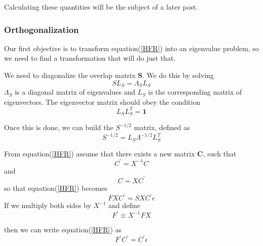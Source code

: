 \documentclass[a4paper]{article}
\begin{document}
Calculating these quantities will be the subject of a later post.

\subsubsection{Orthogonalization}
Our first objective is to transform equation(\ref{HFR}) into an eigenvalue problem, so we need to find a transformation that will do just that.

We need to diagonalize the overlap matrix \textbf{S}. 
We do this by solving
$$
S L_S = \Lambda_S L_S
$$
$\Lambda_S$ is a diagonal matrix of eigenvalues and $L_S$ is the corresponding matrix of eigenvectors.
The eigenvector matrix should obey the condition
$$
L_S L^{T}_{S} = \boldsymbol 1
$$

Once this is done, we can build the $ S^{-1/2}$ matrix, defined as 
$$
S^{-1/2} = L_S \Lambda^{-1/2} L^{T}_{S}
$$

From equation(\ref{HFR}) assume that there exists a new matrix \textbf{C}, such that
$$
C^' = X^{-1} C
$$
and 
$$
C = X C^'
$$
so that equation(\ref{HFR}) becomes
$$
F X C^' = SXC^' \epsilon
$$
If we multiply both sides by $X^{-1}$ and define
$$
F^' \equiv X^{-1} F X
$$

then we can write equation(\ref{HFR}) as 
$$
F^' C^' = C^' \epsilon
$$
\end{document}
